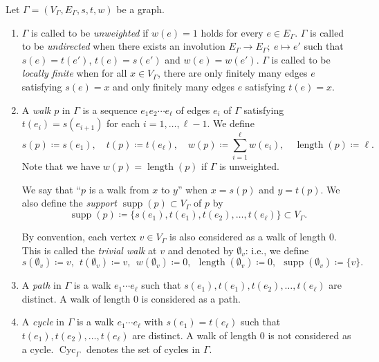 \documentclass[ALCO,published]{cedram}
\theoremstyle{remark}
\begin{document}
\begin{defi}
Let $\Gamma = (V_{\Gamma}, E_{\Gamma}, s, t, w)$ be a graph. 

\begin{enumerate}
\item 
$\Gamma$ is called to be \textit{unweighted} if $w(e) = 1$ holds for every $e \in E_{\Gamma}$. 
$\Gamma$ is called to be \textit{undirected} when 
there exists an involution $E_{\Gamma} \to E_{\Gamma};\ e \mapsto e'$
such that $s(e)=t(e')$, $t(e)=s(e')$ and $w(e)=w(e')$. 
$\Gamma$ is called to be \textit{locally finite} when for all $x \in V_{\Gamma}$, 
there are only finitely many edges $e$ satisfying $s(e)=x$ and only finitely many edges $e$ satisfying $t(e)=x$. 

\item
A \textit{walk} $p$ in $\Gamma$ is a sequence $e_1 e_2 \cdots e_{\ell}$ of edges $e_i$ of $\Gamma$ satisfying 
$t(e_i) = s(e_{i+1})$ for each $i = 1, \ldots , \ell -1$. 
We define 
\[
s(p) \coloneqq  s(e_1), \quad
t(p) \coloneqq  t(e_{\ell}), \quad
w(p) \coloneqq  \sum _{i = 1} ^{\ell} w(e_i), \quad 
\operatorname{length}(p) \coloneqq  \ell. 
\]
Note that we have $w(p) = \operatorname{length}(p)$ if $\Gamma$ is unweighted. 


We say that ``$p$ is a walk from $x$ to $y$'' when $x = s(p)$ and $y = t(p)$. 
We also define the \textit{support} $\operatorname{supp}(p) \subset V_{\Gamma}$ of $p$ by
\[
\operatorname{supp}(p) \coloneqq  \{ s(e_1), t(e_1), t(e_2), \ldots , t(e_{\ell}) \} \subset V_{\Gamma}. 
\]

By convention, each vertex $v \in V_{\Gamma}$ is also considered as a walk of length $0$. 
This is called the \textit{trivial walk} at $v$ and denoted by $\emptyset _v$: i.e., 
we define 
\[
s(\emptyset _v) \coloneqq  v, \ \ 
t(\emptyset _v) \coloneqq  v, \ \ 
w(\emptyset _v) \coloneqq  0, \ \  
\operatorname{length}(\emptyset _v) \coloneqq  0, \ \ 
\operatorname{supp}(\emptyset _v) \coloneqq  \{ v \}.
\]

\item 
A \textit{path} in $\Gamma$ is a walk $e_1 \cdots e_{\ell}$ such that $s(e_1), t(e_1), t(e_2), \ldots, t(e_{\ell})$ are distinct. 
A walk of length $0$ is considered as a path. 

\item
A \textit{cycle} in $\Gamma$ is a walk $e_1 \cdots e_{\ell}$ with $s(e_1) = t(e_{\ell})$ 
such that $t(e_1), t(e_2), \ldots, t(e_{\ell})$ are distinct. 
A walk of length $0$ is not considered as a cycle. 
$\operatorname{Cyc}_{\Gamma}$ denotes the set of cycles in $\Gamma$. 


\end{enumerate}
\end{defi}
\end{document}

